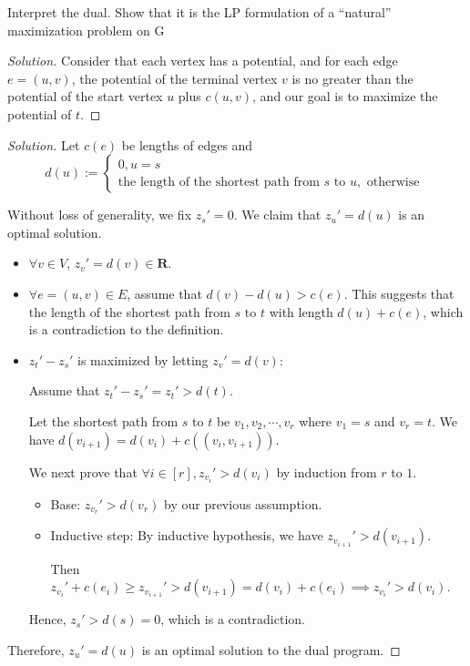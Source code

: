     \begin{thm}{}{}
        Interpret the dual. Show that it is the LP formulation of a ``natural'' maximization problem on G
    \end{thm}
    
    \begin{proof}[Solution]
        Consider that each vertex has a potential, and for each edge $e=(u,v)$, 
        the potential of the terminal vertex $v$ is no greater than the potential of the start vertex $u$ plus $c(u, v)$, 
        and our goal is to maximize the potential of $t$. 
    \end{proof}

    \newpage
    
    \begin{proof}[Solution]
        Let $c(e)$ be lengths of edges and 
        $$d(u) := \begin{cases}
        0, u = s \\
        \text{the length of the shortest path from } s \text{ to } u, \text{ otherwise }
        \end{cases}$$
        
        Without loss of generality, we fix $z_s' = 0$. We claim that $z_u' = d(u)$ is an optimal solution. 
        \begin{itemize}
            \item $\forall v \in V$, $z_v' = d(v) \in \mathbf R $.
            \item $\forall e = (u, v) \in E$, assume that $d(v) - d(u) > c(e)$. This suggests that the length of the shortest path from $s$ to $t$ with length $d(u) + c(e)$, which is a contradiction to the definition.
            \item $z_t' - z_s'$ is maximized by letting $z_v' = d(v)$:
            
            Assume that $z_t' - z_s' = z_t' > d(t)$.
            
            Let the shortest path from $s$ to $t$ be $v_1, v_2, \cdots , v_r$ where $v_1 = s$ and $v_r = t$. We have $d(v_{i+1}) = d(v_i) + c((v_i, v_{i+1}))$.
            
            We next prove that $\forall i \in [r], z_{v_i}' > d({v_i})$ by induction from $r$ to $1$.
            \begin{itemize}
                \item Base: $z_{v_r}' > d(v_r)$ by our previous assumption.
                \item Inductive step: By inductive hypothesis, we have $z_{v_{i+1}}' > d(v_{i+1})$.
                
                Then $z_{v_i}' + c(e_i) \ge z_{v_{i+1}}' > d(v_{i+1}) = d(v_i) + c(e_i) \implies z_{v_i}' > d(v_i)$.
            \end{itemize}
            
            Hence, $z_s' > d(s) = 0$, which is a contradiction.
        \end{itemize}
        
        Therefore, $z_u' = d(u)$ is an optimal solution to the dual program.
    \end{proof}


